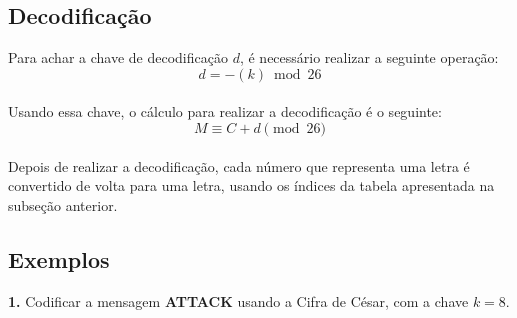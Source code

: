 \subsection{Decodificação}
Para achar a chave de decodificação $d$, é necessário realizar a seguinte operação:
\[
    d = -(k) \bmod{26}
\]\\
Usando essa chave, o cálculo para realizar a decodificação é o seguinte:
\[
    M \equiv C + d \pmod {26}
\]\\
Depois de realizar a decodificação, cada número que representa uma letra é convertido de volta para uma letra, usando os índices da tabela apresentada na subseção anterior.

\subsection*{Exemplos}
\textbf{1.} Codificar a mensagem \textbf{ATTACK} usando a Cifra de César, com a chave $k = 8$.

